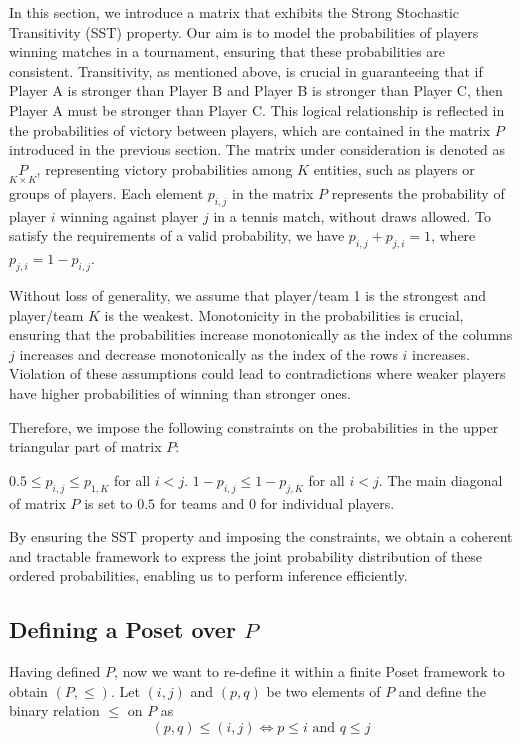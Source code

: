 \documentclass[11pt]{amsart}
\begin{document}
In this section, we introduce a matrix that exhibits the Strong Stochastic Transitivity (SST) property. Our aim is to model the probabilities of players winning matches in a tournament, ensuring that these probabilities are consistent. Transitivity, as mentioned above, is crucial in guaranteeing that if Player A is stronger than Player B and Player B is stronger than Player C, then Player A must be stronger than Player C. This logical relationship is reflected in the probabilities of victory between players, which are contained in the matrix $P$ introduced in the previous section.
The matrix under consideration is denoted as $\underset{K \times K}{P}$, representing victory probabilities among $K$ entities, such as players or groups of players. Each element $p_{i,j}$ in the matrix $P$ represents the probability of player $i$ winning against player $j$ in a tennis match, without draws allowed. To satisfy the requirements of a valid probability, we have $p_{i,j} + p_{j,i} = 1$, where $p_{j,i} = 1 - p_{i,j}$.

Without loss of generality, we assume that player/team 1 is the strongest and player/team $K$ is the weakest. Monotonicity in the probabilities is crucial, ensuring that the probabilities increase monotonically as the index of the columns $j$ increases and decrease monotonically as the index of the rows $i$ increases. Violation of these assumptions could lead to contradictions where weaker players have higher probabilities of winning than stronger ones.

Therefore, we impose the following constraints on the probabilities in the upper triangular part of matrix $P$:

$0.5 \leq p_{i,j} \leq p_{1,K}$ for all $i<j$.
$1 - p_{i,j} \leq 1 - p_{j,K}$ for all $i<j$.
The main diagonal of matrix $P$ is set to $0.5$ for teams and $0$ for individual players.

By ensuring the SST property and imposing the constraints, we obtain a coherent and tractable framework to express the joint probability distribution of these ordered probabilities, enabling us to perform inference efficiently.


\subsection{Defining a Poset over $P$}
Having defined $P$, now we want to re-define it within a finite Poset framework to obtain $(P, \leq)$. Let $(i,j)$ and $(p,q)$ be two elements of $P$ and define the binary relation $\leq$ on $P$ as 
\begin{equation}
(p,q) \leq (i,j)  \iff p \leq i \text{ and } q \leq j
\end{equation}
\end{document}
